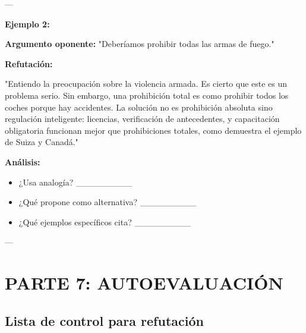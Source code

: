 \documentclass[a4paper,11pt]{article}
\begin{document}
\vspace{0.2cm}

---

\vspace{0.2cm}

\textbf{Ejemplo 2:}

\vspace{0.2cm}

\textbf{Argumento oponente:} "Deberíamos prohibir todas las armas de fuego."

\vspace{0.2cm}

\textbf{Refutación:}

"Entiendo la preocupación sobre la violencia armada. Es cierto que este es un problema serio. Sin embargo, una prohibición total es como prohibir todos los coches porque hay accidentes. La solución no es prohibición absoluta sino regulación inteligente: licencias, verificación de antecedentes, y capacitación obligatoria funcionan mejor que prohibiciones totales, como demuestra el ejemplo de Suiza y Canadá."

\vspace{0.2cm}

\textbf{Análisis:}

\begin{itemize}

  \item ¿Usa analogía? _________

  \item ¿Qué propone como alternativa? _________

  \item ¿Qué ejemplos específicos cita? _________

\end{itemize}

\vspace{0.2cm}

---

\vspace{0.2cm}

\section{PARTE 7: AUTOEVALUACIÓN}

\vspace{0.2cm}

\subsection{Lista de control para refutación}
\end{document}
